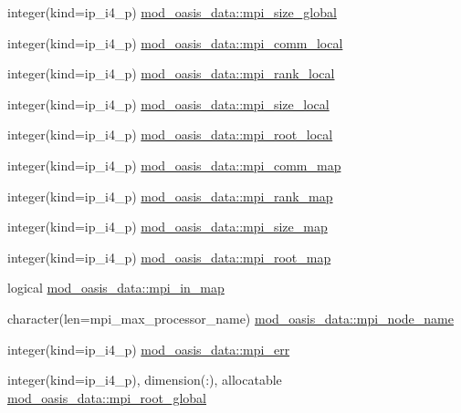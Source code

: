 \begin{DoxyCompactItemize}
\item 
integer(kind=ip\+\_\+i4\+\_\+p) \hyperlink{namespacemod__oasis__data_a83a9d498c6829e2058675a07446ce5be}{mod\+\_\+oasis\+\_\+data\+::mpi\+\_\+size\+\_\+global}
\item 
integer(kind=ip\+\_\+i4\+\_\+p) \hyperlink{namespacemod__oasis__data_acd8801d4fab87a19c6f4f69a661d56c5}{mod\+\_\+oasis\+\_\+data\+::mpi\+\_\+comm\+\_\+local}
\item 
integer(kind=ip\+\_\+i4\+\_\+p) \hyperlink{namespacemod__oasis__data_a811747a1592795f860854f09f19d4c25}{mod\+\_\+oasis\+\_\+data\+::mpi\+\_\+rank\+\_\+local}
\item 
integer(kind=ip\+\_\+i4\+\_\+p) \hyperlink{namespacemod__oasis__data_a617f69fb4d4bb96a94f83a124b4d0030}{mod\+\_\+oasis\+\_\+data\+::mpi\+\_\+size\+\_\+local}
\item 
integer(kind=ip\+\_\+i4\+\_\+p) \hyperlink{namespacemod__oasis__data_a2c468f26bc0c9b2ad5d54d68733e7047}{mod\+\_\+oasis\+\_\+data\+::mpi\+\_\+root\+\_\+local}
\item 
integer(kind=ip\+\_\+i4\+\_\+p) \hyperlink{namespacemod__oasis__data_a8ff971286c1f235b8a328b3298f58a9b}{mod\+\_\+oasis\+\_\+data\+::mpi\+\_\+comm\+\_\+map}
\item 
integer(kind=ip\+\_\+i4\+\_\+p) \hyperlink{namespacemod__oasis__data_a5e29025a6d83c7a01f88febbb734b7e9}{mod\+\_\+oasis\+\_\+data\+::mpi\+\_\+rank\+\_\+map}
\item 
integer(kind=ip\+\_\+i4\+\_\+p) \hyperlink{namespacemod__oasis__data_ac4a6f10dab1d3078f8467465c21b9fdd}{mod\+\_\+oasis\+\_\+data\+::mpi\+\_\+size\+\_\+map}
\item 
integer(kind=ip\+\_\+i4\+\_\+p) \hyperlink{namespacemod__oasis__data_a177c2b47ae4c69407d55817cd468b0ae}{mod\+\_\+oasis\+\_\+data\+::mpi\+\_\+root\+\_\+map}
\item 
logical \hyperlink{namespacemod__oasis__data_a799f6f0a442fcc2ab9960814b8b1b74a}{mod\+\_\+oasis\+\_\+data\+::mpi\+\_\+in\+\_\+map}
\item 
character(len=mpi\+\_\+max\+\_\+processor\+\_\+name) \hyperlink{namespacemod__oasis__data_ad186b77d375be587e4f198ca45026d2e}{mod\+\_\+oasis\+\_\+data\+::mpi\+\_\+node\+\_\+name}
\item 
integer(kind=ip\+\_\+i4\+\_\+p) \hyperlink{namespacemod__oasis__data_abd48a08a17f07ec656912d9b2b7b7922}{mod\+\_\+oasis\+\_\+data\+::mpi\+\_\+err}
\item 
integer(kind=ip\+\_\+i4\+\_\+p), dimension(\+:), allocatable \hyperlink{namespacemod__oasis__data_a7f03d4afc0c91a42b13ddcf7ec082e51}{mod\+\_\+oasis\+\_\+data\+::mpi\+\_\+root\+\_\+global}

\end{DoxyCompactItemize}
